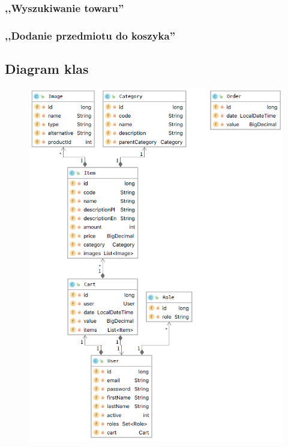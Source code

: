 \documentclass[12pt,a4paper,titlepage]{article}
\begin{document}
\subsubsection{,,Wyszukiwanie towaru''}
\begin{figure}[H]
    \centering
    \scalebox{.8}{}
\end{figure}

\subsubsection{,,Dodanie przedmiotu do koszyka''}
\begin{figure}[H]
    \centering
    \scalebox{.8}{}
\end{figure}

\subsection{Diagram klas}
\begin{figure}[H]
    \centering
    \includegraphics[scale=.7]{Pics/classDiagram.png}
\end{figure}
\end{document}
